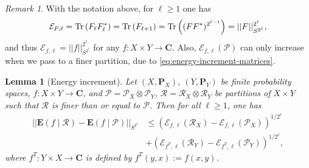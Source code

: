 \documentclass[reqno,11pt]{amsart}
\newtheorem{lemma}[theorem]{Lemma}
\theoremstyle{definition}
\theoremstyle{remark}
\newtheorem*{remark}{Remark}
\numberwithin{equation}{section}
\newcommand{\C}{\mathbf{C}}
\renewcommand{\P}{\mathbf{P}}
\newcommand{\E}{\mathbf{E}}
\newcommand{\mE}{\mathcal{E}}
\newcommand{\mR}{\mathcal{R}}
\newcommand{\mP}{\mathcal{P}}
\newcommand{\Tr}{\textnormal{Tr}}
\begin{document}
\begin{remark}
With the notation above, for $\ell \ge 1$ one has
\[
    \mE_{F,\ell} = \Tr \left(F_\ell F_\ell^* \right) =
    \Tr \left(F_{\ell+1} \right)
    = \Tr \left((FF^*)^{2^{\ell-1}} \right)
    =
    ||F||_{S^{2^{\ell}}}^{2^{\ell}},
\]
and thus $\mE_{f,\ell} = ||f||_{S^{2^\ell}}^{2^\ell}$ for any $f : X \times Y \to \C$. Also, $\mE_{f,\ell}(\mP)$ can only increase when we pass to a finer partition, due to \cref{eq:energy-increment-matrices}.
\end{remark}


\begin{lemma}[Energy increment] \label{lem:energy-increment}
Let $(X, \P_X)$, $(Y, \P_Y)$ be finite probability spaces, $f : X \times Y \to \C$, and $\mP = \mP_X \otimes \mP_Y$, $\mR = \mR_X \otimes \mR_Y$ be partitions of $X \times Y$ such that $\mR$ is finer than or equal to $\mP$. Then for all $\ell \ge 1$, one has
\[
\begin{aligned}
    ||\E(f \mid \mR) - \E(f \mid \mP)||_{S^{2^\ell}} 
    &\le 
    (\mE_{f,\ell}(\mR_X) - \mE_{f,\ell}(\mP_X))^{1/2^\ell}
    \\
    &+
    (\mE_{f^T,\ell}(\mR_Y) - \mE_{f^T,\ell}(\mP_Y))^{1/2^\ell},
\end{aligned}
\]
where $f^T : Y \times X \to \C$ is defined by $f^T(y, x) := f(x, y)$.
\end{lemma}
\end{document}
